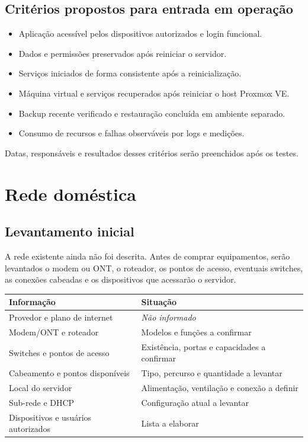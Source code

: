 \documentclass[11pt,a4paper,oneside]{report}
\newcommand{\naoinformado}{\textit{Não informado}}
\begin{document}
\section{Critérios propostos para entrada em operação}
\begin{itemize}
\item Aplicação acessível pelos dispositivos autorizados e login funcional.
\item Dados e permissões preservados após reiniciar o servidor.
\item Serviços iniciados de forma consistente após a reinicialização.
\item Máquina virtual e serviços recuperados após reiniciar o host Proxmox VE.
\item Backup recente verificado e restauração concluída em ambiente separado.
\item Consumo de recursos e falhas observáveis por logs e medições.
\end{itemize}
Datas, responsáveis e resultados desses critérios serão preenchidos após os testes.

\chapter{Rede doméstica}
\section{Levantamento inicial}
A rede existente ainda não foi descrita. Antes de comprar equipamentos, serão
levantados o modem ou ONT, o roteador, os pontos de acesso, eventuais switches,
as conexões cabeadas e os dispositivos que acessarão o servidor.

\begin{tabularx}{\textwidth}{@{}p{4cm}Y@{}}
\toprule
Informação & Situação \\
\midrule
Provedor e plano de internet & \naoinformado \\
Modem/ONT e roteador & Modelos e funções a confirmar \\
Switches e pontos de acesso & Existência, portas e capacidades a confirmar \\
Cabeamento e pontos disponíveis & Tipo, percurso e quantidade a levantar \\
Local do servidor & Alimentação, ventilação e conexão a definir \\
Sub-rede e DHCP & Configuração atual a levantar \\
Dispositivos e usuários autorizados & Lista a elaborar \\
\bottomrule
\end{tabularx}
\end{document}
